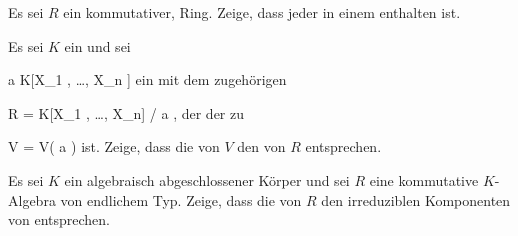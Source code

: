 {}
{





Es sei $R$ ein kommutativer,
Ring. Zeige, dass jeder
in einem
enthalten ist.





}
{} {}

{}
{





Es sei $K$ ein
und sei

\mavergleichskette
{\vergleichskette
{ {\mathfrak a}
}
{ \subseteq }{ K[X_1 , \ldots , X_n ]
}
{  }{
}
{    }{
}
{   }{
}
}
{}{}{}
ein
mit dem zugehörigen

\mavergleichskette
{\vergleichskette
{R
}
{ = }{ K[X_1 , \ldots , X_n] / {\mathfrak a}
}
{  }{
}
{    }{
}
{   }{
}
}
{}{}{,}
der der
zu

\mavergleichskette
{\vergleichskette
{V
}
{ = }{ V( {\mathfrak a} )
}
{  }{
}
{    }{
}
{   }{
}
}
{}{}{}
ist. Zeige, dass die
von $V$ den
von $R$ entsprechen.





}
{} {}

{}
{





Es sei $K$ ein algebraisch abgeschlossener Körper und sei $R$ eine kommutative $K$-Algebra von endlichem Typ. Zeige, dass die
von $R$ den irreduziblen Komponenten von
 entsprechen.





}
{} {}






